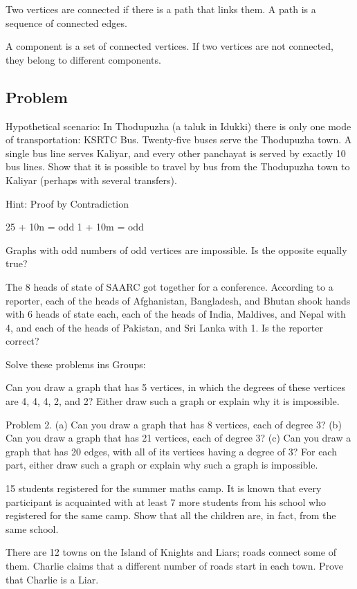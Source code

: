 \documentclass[a4paper,12pt]{article}
\begin{document}
Two vertices are connected if there is a path that links them. A path is a sequence of connected edges.

A component is a set of connected vertices. If two vertices are not connected, they belong to diﬀerent components.
\subsection{Problem}
Hypothetical scenario: In Thodupuzha (a taluk in Idukki) there is only one mode of transportation: KSRTC Bus. Twenty-five buses serve the Thodupuzha town. A single bus line serves Kaliyar, and every other panchayat is served by exactly 10 bus lines. Show that it is possible to travel by bus from the Thodupuzha town to Kaliyar (perhaps with several transfers).

Hint: Proof by Contradiction

25 + 10n = odd
1 + 10m = odd

Graphs with odd numbers of odd vertices are impossible. Is the opposite equally true?

The 8 heads of state of SAARC got together for a conference. According to a reporter, each of the heads of Afghanistan, Bangladesh, and Bhutan shook hands with 6 heads of state each, each of the heads of India, Maldives, and Nepal with 4, and each of the heads of Pakistan, and Sri Lanka with 1. Is the reporter correct?

Solve these problems ins Groups:

Can you draw a graph that has 5 vertices, in which the degrees of these vertices are 4, 4, 4, 2, and 2? Either draw such a graph or explain why it is impossible.


Problem 2.
(a) Can you draw a graph that has 8 vertices, each of degree 3?
(b) Can you draw a graph that has 21 vertices, each of degree 3?
(c) Can you draw a graph that has 20 edges, with all of its vertices having a degree of 3?
For each part, either draw such a graph or explain why such a graph is impossible.

15 students registered for the summer maths camp. It is known that every participant is acquainted with at least 7 more students from his school who registered for the same camp. Show that all the children are, in fact, from the same school.

There are 12 towns on the Island of Knights and Liars; roads connect some of them. Charlie claims that a diﬀerent number of roads start in each town. Prove that Charlie is a Liar.
\end{document}
